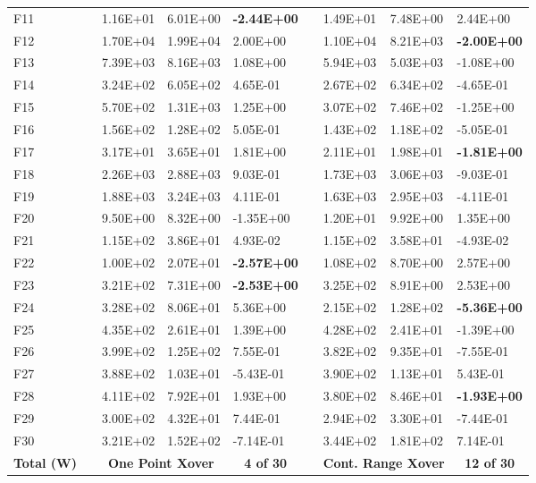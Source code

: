 \documentclass[graybox]{svmult}
\begin{document}
\begin{table}[]
\begin{tabular}{@{}lllllllll@{}}
    F11 &  & 1.16E+01 & 6.01E+00 & \textbf{-2.44E+00} &  & 1.49E+01 & 7.48E+00 & 2.44E+00 \\
    F12 &  & 1.70E+04 & 1.99E+04 & 2.00E+00 &  & 1.10E+04 & 8.21E+03 & \textbf{-2.00E+00} \\
    F13 &  & 7.39E+03 & 8.16E+03 & 1.08E+00 &  & 5.94E+03 & 5.03E+03 & -1.08E+00 \\
    F14 &  & 3.24E+02 & 6.05E+02 & 4.65E-01 &  & 2.67E+02 & 6.34E+02 & -4.65E-01 \\
    F15 &  & 5.70E+02 & 1.31E+03 & 1.25E+00 &  & 3.07E+02 & 7.46E+02 & -1.25E+00 \\
    F16 &  & 1.56E+02 & 1.28E+02 & 5.05E-01 &  & 1.43E+02 & 1.18E+02 & -5.05E-01 \\
    F17 &  & 3.17E+01 & 3.65E+01 & 1.81E+00 &  & 2.11E+01 & 1.98E+01 & \textbf{-1.81E+00} \\
    F18 &  & 2.26E+03 & 2.88E+03 & 9.03E-01 &  & 1.73E+03 & 3.06E+03 & -9.03E-01 \\
    F19 &  & 1.88E+03 & 3.24E+03 & 4.11E-01 &  & 1.63E+03 & 2.95E+03 & -4.11E-01 \\
    F20 &  & 9.50E+00 & 8.32E+00 & -1.35E+00 &  & 1.20E+01 & 9.92E+00 & 1.35E+00 \\
    F21 &  & 1.15E+02 & 3.86E+01 & 4.93E-02 &  & 1.15E+02 & 3.58E+01 & -4.93E-02 \\
    F22 &  & 1.00E+02 & 2.07E+01 & \textbf{-2.57E+00} &  & 1.08E+02 & 8.70E+00 & 2.57E+00 \\
    F23 &  & 3.21E+02 & 7.31E+00 & \textbf{-2.53E+00} &  & 3.25E+02 & 8.91E+00 & 2.53E+00 \\
    F24 &  & 3.28E+02 & 8.06E+01 & 5.36E+00 &  & 2.15E+02 & 1.28E+02 & \textbf{-5.36E+00} \\
    F25 &  & 4.35E+02 & 2.61E+01 & 1.39E+00 &  & 4.28E+02 & 2.41E+01 & -1.39E+00 \\
    F26 &  & 3.99E+02 & 1.25E+02 & 7.55E-01 &  & 3.82E+02 & 9.35E+01 & -7.55E-01 \\
    F27 &  & 3.88E+02 & 1.03E+01 & -5.43E-01 &  & 3.90E+02 & 1.13E+01 & 5.43E-01 \\
    F28 &  & 4.11E+02 & 7.92E+01 & 1.93E+00 &  & 3.80E+02 & 8.46E+01 & \textbf{-1.93E+00} \\
    F29 &  & 3.00E+02 & 4.32E+01 & 7.44E-01 &  & 2.94E+02 & 3.30E+01 & -7.44E-01 \\
    F30 &  & 3.21E+02 & 1.52E+02 & -7.14E-01 &  & 3.44E+02 & 1.81E+02 & 7.14E-01 \\
    \textbf{Total (W)} &  & \multicolumn{2}{c}{\textbf{One Point Xover}} & \multicolumn{1}{c}{\textbf{4 of 30}} &  & \multicolumn{2}{c}{\textbf{Cont. Range Xover}} & \multicolumn{1}{c}{\textbf{12 of 30}} \\ \bottomrule
    \end{tabular}
    \end{table}
\end{document}
